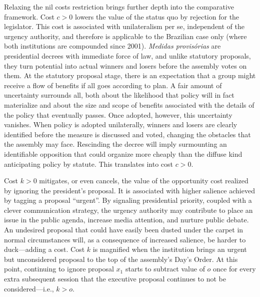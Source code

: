 \documentclass[letter,12pt]{article}
\begin{document}
Relaxing the nil costs restriction brings further depth into the comparative framework. Cost $c>0$ lowers the value of the status quo by rejection for the legislator. This cost is associated with unilateralism per se, independent of the urgency authority, and therefore is applicable to the Brazilian case only (where both institutions are compounded since 2001). \emph{Medidas provis\'orias} are presidential decrees with immediate force of law, and unlike statutory proposals, they turn potential into actual winners and losers before the assembly votes on them. At the statutory proposal stage, there is an expectation that a group might receive a flow of benefits if all goes according to plan. A fair amount of uncertainty surrounds all, both about the likelihood that policy will in fact materialize and about the size and scope of benefits associated with the details of the policy that eventually passes. Once adopted, however, this uncertainty vanishes. When policy is adopted unilaterally, winners and losers are clearly identified before the measure is discussed and voted, changing the obstacles that the assembly may face. Rescinding the decree will imply surmounting an identifiable opposition that could organize more cheaply than the diffuse kind \citep{olson.1965} anticipating policy by statute. This translates into cost $c>0$.  

Cost $k>0$ mitigates, or even cancels, the value of the opportunity cost realized by ignoring the president's proposal. It is associated with higher salience achieved by tagging a proposal ``urgent''. By signaling presidential priority, coupled with a clever communication strategy, the urgency authority may contribute to place an issue in the public agenda, increase media attention, and nurture public debate. An undesired proposal that could have easily been dusted under the carpet in normal circumstances will, as a consequence of increased salience, be harder to duck---adding a cost. Cost $k$ is magnified when the institution brings an urgent but unconsidered proposal to the top of the assembly's Day's Order. At this point, continuing to ignore proposal $x_1$ starts to subtract value of $o$ once for every extra subsequent session that the executive proposal continues to not be considered---i.e., $k>o$. 
\end{document}
